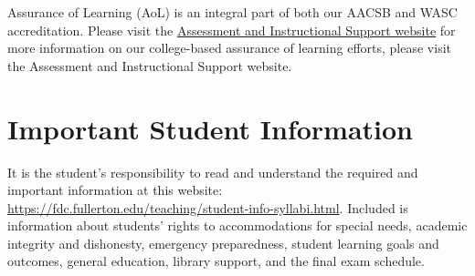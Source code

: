 \documentclass{./../Latex/syllabus}
\begin{document}
Assurance of Learning (AoL) is an integral part of both our AACSB and WASC accreditation. Please visit the \href{https://business.fullerton.edu/assessment}{Assessment and Instructional Support website} for more information on our college-based assurance of learning efforts, please visit the Assessment and Instructional Support website.

\section*{Important Student Information}
It is the student's responsibility to read and understand the required and important information at this website: \href{https://fdc.fullerton.edu/teaching/student-info-syllabi.html}{https://fdc.fullerton.edu/teaching/student-info-syllabi.html}. Included is information about students' rights to accommodations for special needs, academic integrity and dishonesty, emergency preparedness, student learning goals and outcomes, general education, library support, and the final exam schedule.


\end{document}
